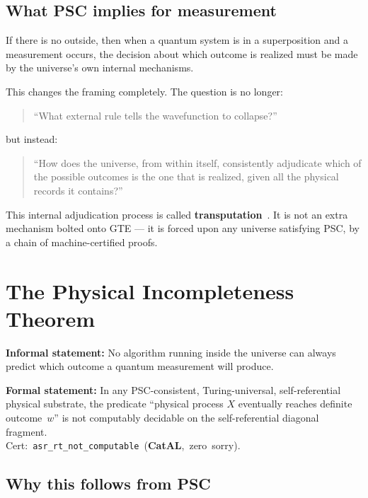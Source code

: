 \documentclass[11pt,a4paper]{article}
\newcommand{\term}[1]{\textbf{#1}}
\newcommand{\lean}[1]{\texttt{#1}}
\newcommand{\CatAL}{\textbf{CatAL}}
\begin{document}
\subsection{What PSC implies for measurement}

If there is no outside, then when a quantum system is in a superposition and a
measurement occurs, the decision about which outcome is realized must be made by
the universe's own internal mechanisms.

This changes the framing completely.  The question is no longer:
\begin{quote}
  ``What external rule tells the wavefunction to collapse?''
\end{quote}
but instead:
\begin{quote}
  ``How does the universe, from within itself, consistently adjudicate which of
  the possible outcomes is the one that is realized, given all the physical records
  it contains?''
\end{quote}

This internal adjudication process is called \term{transputation}~\cite{SpivackPolynomialTransputation}.  It is not an
extra mechanism bolted onto GTE --- it is forced upon any universe satisfying PSC,
by a chain of machine-certified proofs.

\section{The Physical Incompleteness Theorem}

\begin{tcolorbox}[colback=boxorange,colframe=orange!60!black,title=The Physical Incompleteness Theorem (PIT)]
\textbf{Informal statement:}
No algorithm running inside the universe can always predict which outcome a
quantum measurement will produce.

\textbf{Formal statement:}
In any PSC-consistent, Turing-universal, self-referential physical substrate,
the predicate ``physical process $X$ eventually reaches definite outcome~$w$''
is not computably decidable on the self-referential diagonal fragment.\\[4pt]
\mbox{Cert: \lean{asr\_rt\_not\_computable} (\CatAL, zero sorry).}
\end{tcolorbox}

\subsection{Why this follows from PSC}
\end{document}
